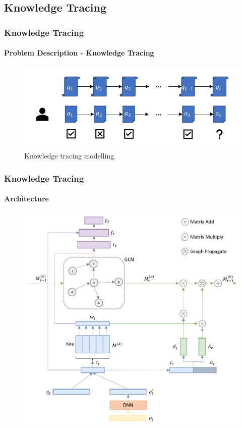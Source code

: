 \documentclass{beamer}
\begin{document}
\subsection{Knowledge Tracing}

\begin{frame}
	\frametitle{Knowledge Tracing}
	\framesubtitle{Problem Description - Knowledge Tracing}
	\begin{figure}
		\centering
		\includegraphics[width=1.0\textwidth]{figures/ch3-model-ktdes.pdf}
		\caption{Knowledge tracing modelling}
	\end{figure}
\end{frame}


\begin{frame}
	\frametitle{Knowledge Tracing}
	\framesubtitle{Architecture}
	\begin{figure}
		\centering
		\includegraphics[height=0.80\textheight]{figures/ch3-ov.pdf}
	\end{figure}
\end{frame}
\end{document}
